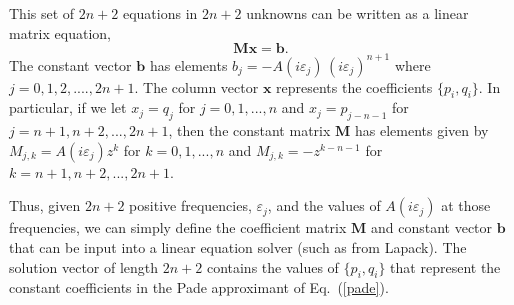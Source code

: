 This set of $2n + 2$ equations in $2n + 2$ unknowns can be
written as a linear matrix equation,
\begin{equation}
\mathbf{M} \mathbf{x} = \mathbf{b}.
\end{equation}
The constant vector $\mathbf{b}$ has 
elements $b_j = -A(i\varepsilon_j) \,(i \varepsilon_j)^{n+1}$
where $j = 0, 1, 2, ...., 2n + 1$. The column vector $\mathbf{x}$
represents the coefficients $\{p_i,q_i\}$.  In particular,
if we let $x_j = q_j$ for $j = 0, 1, ..., n$ and
$x_j = p_{j - n - 1}$ for $j = n+1, n+2, ..., 2n+1$, then
the constant matrix $\mathbf{M}$ has elements given by
$M_{j,k} = A(i\varepsilon_j) z^k$ for $k = 0, 1, ..., n$
and $M_{j,k} = -z^{k - n - 1}$ for $k = n+1, n+2, ..., 2n+1$.

Thus, given $2n+2$ positive frequencies, $\varepsilon_j$, and 
the values of $A(i\varepsilon_j)$ at those frequencies,
we can simply define the coefficient matrix
$\mathbf{M}$ and constant 
vector $\mathbf{b}$ that can be input into a linear equation
solver (such as from Lapack).  The solution vector
of length $2n+2$ contains the values of $\{ p_i, q_i \}$
that represent the constant coefficients in the 
Pade approximant of Eq.~(\ref{pade}).


